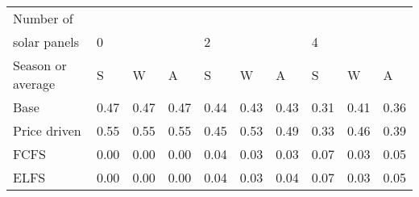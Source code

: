 \begin{table}[h] 
\centering 
\begin{tabular}{l|lll|lll|lll}Number of \\ solar panels&0& & &2& & &4& & \\ \hline 
Season or average & S & W & A & S & W & A & S & W & A \\ \hline 
Base&0.47&0.47&0.47&0.44&0.43&0.43&0.31&0.41&0.36 \\ 
Price driven&0.55&0.55&0.55&0.45&0.53&0.49&0.33&0.46&0.39 \\ 
FCFS&0.00&0.00&0.00&0.04&0.03&0.03&0.07&0.03&0.05 \\ 
ELFS&0.00&0.00&0.00&0.04&0.03&0.04&0.07&0.03&0.05 \\ 
\end{tabular} 
\end{table}